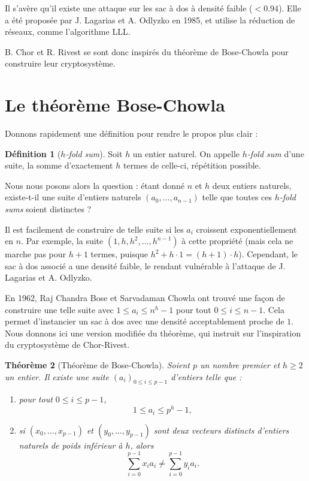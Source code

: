 \documentclass[a4paper, titlepage]{article}
\newtheorem{theo}{Théorème}[section]
\theoremstyle{definition}
\newtheorem{defi}[theo]{Définition}
\theoremstyle{remark}
\begin{document}
Il s'avère qu'il existe une attaque sur les sac à dos à  densité faible ($< 0.94$). Elle a été proposée par J. Lagarias et A. Odlyzko en 1985, et utilise la réduction de réseaux, comme l'algorithme LLL.

B. Chor et R. Rivest se sont donc inspirés du théorème de Bose-Chowla pour construire leur cryptosystème.

\section{Le théorème Bose-Chowla}

Donnons rapidement une définition pour rendre le propos plus clair :

\begin{defi}[\textit{$h$-fold sum}]
Soit $h$ un entier naturel. On appelle \textit{$h$-fold sum} d'une suite, la somme d'exactement $h$ termes de celle-ci, répétition possible.
\end{defi}

Nous nous posons alors la question : étant donné $n$ et $h$ deux entiers naturels, existe-t-il une suite d'entiers naturels $(a_0, \dots, a_{n-1})$ telle que toutes ces \textit{$h$-fold sums} soient distinctes ?

Il est facilement de construire de telle suite si les $a_i$ croissent exponentiellement en $n$. Par exemple, la suite $(1, h, h^2, \dots, h^{n-1})$ à cette propriété (mais cela ne marche pas pour $h+1$ termes, puisque $h^2 + h\cdot1 = (h+1) \cdot h$). Cependant, le sac à dos associé a une  densité faible, le rendant vulnérable à l'attaque de J. Lagarias et A. Odlyzko.

En 1962, Raj Chandra Bose et Sarvadaman Chowla ont trouvé une façon de construire une telle suite avec $1 \leqslant a_i \leqslant n^h-1$ pour tout ${0 \leqslant i \leqslant n-1}$. Cela permet d'instancier un sac à dos avec une densité acceptablement proche de $1$. Nous donnons ici une version modifiée du théorème, qui instruit sur l'inspiration du cryptosystème de Chor-Rivest.

\begin{theo}[Théorème de Bose-Chowla]
Soient $p$ un nombre premier et $h \geqslant 2$ un entier. Il existe une suite ${(a_i)}_{0\leqslant i \leqslant p-1}$ d'entiers telle que : \begin{enumerate}
\item pour tout $0 \leqslant i \leqslant p-1$, $$1 \leqslant a_i \leqslant p^h-1,$$
\item si $(x_0, \dots, x_{p-1})$ et $(y_0, \dots, y_{p-1})$ sont deux vecteurs distincts d'entiers naturels de poids inférieur à $h$, alors 
$$\sum_{i=0}^{p-1} x_ia_i \neq \sum_{i=0}^{p-1} y_ia_i.$$
\end{enumerate}
\end{theo}
\end{document}
